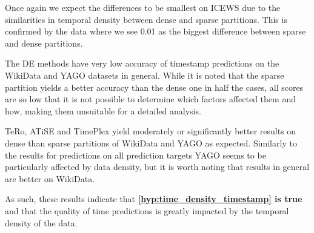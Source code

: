 

Once again we expect the differences to be smallest on ICEWS due to the similarities in temporal density between dense and sparse partitions. This is confirmed by the data where we see 0.01 as the biggest difference between sparse and dense partitions.

The DE methods have very low accuracy of timestamp predictions on the WikiData and YAGO datasets in general.
While it is noted that the sparse partition yields a better accuracy than the dense one in half the cases, all scores are so low that it is not possible to determine which factors affected them and how, making them unsuitable for a detailed analysis.

TeRo, ATiSE and TimePlex yield moderately or significantly better results on dense than sparse partitions of WikiData and YAGO as expected. Similarly to the results for predictions on all prediction targets YAGO seems to be particularly affected by data density, but it is worth noting that results in general are better on WikiData.

As such, these results indicate that \textbf{\autoref{hyp:time_density_timestamp} is true} and that the quality of time predictions is greatly impacted by the temporal density of the data.